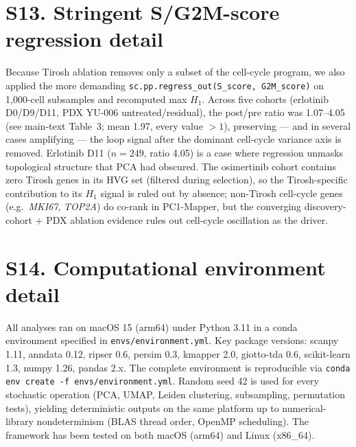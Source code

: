 \documentclass[11pt,a4paper]{article}
\begin{document}
\section*{S13. Stringent S/G2M-score regression detail}

Because Tirosh ablation removes only a subset of the cell-cycle
program, we also applied the more demanding
\texttt{sc.pp.regress\_out(S\_score, G2M\_score)} on 1{,}000-cell
subsamples and recomputed max $H_1$. Across five cohorts (erlotinib
D0/D9/D11, PDX YU-006 untreated/residual), the post/pre ratio was
1.07--4.05 (see main-text Table~3; mean 1.97, every value
$>1$), preserving --- and in several cases amplifying --- the loop
signal after the dominant cell-cycle variance axis is removed.
Erlotinib D11 ($n = 249$, ratio 4.05) is a case where regression
unmasks topological structure that PCA had obscured. The osimertinib
cohort contains zero Tirosh genes in its HVG set (filtered during
selection), so the Tirosh-specific contribution to its $H_1$ signal
is ruled out by absence; non-Tirosh cell-cycle genes (e.g.\
\emph{MKI67}, \emph{TOP2A}) do co-rank in PC1-Mapper, but the
converging discovery-cohort + PDX ablation evidence rules out
cell-cycle oscillation as the driver.

\section*{S14. Computational environment detail}

All analyses ran on macOS 15 (arm64) under Python 3.11 in a conda
environment specified in \texttt{envs/environment.yml}. Key package
versions: scanpy 1.11, anndata 0.12, ripser 0.6, persim 0.3,
kmapper 2.0, giotto-tda 0.6, scikit-learn 1.3, numpy 1.26,
pandas 2.x. The complete environment is reproducible via
\texttt{conda env create -f envs/environment.yml}. Random seed 42
is used for every stochastic operation (PCA, UMAP, Leiden
clustering, subsampling, permutation tests), yielding deterministic
outputs on the same platform up to numerical-library nondeterminism
(BLAS thread order, OpenMP scheduling). The framework has been
tested on both macOS (arm64) and Linux (x86\_64).



\end{document}
